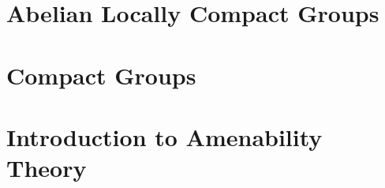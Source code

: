 \documentclass[11pt, a4paper]{memoir}
\theoremstyle{change}
\theoremstyle{plain}
\theoremstyle{nonumberplain}
\numberwithin{equation}{section}
\begin{document}
\section{Abelian Locally Compact Groups}
\section{Compact Groups}
\section{Introduction to Amenability Theory}
\end{document}
